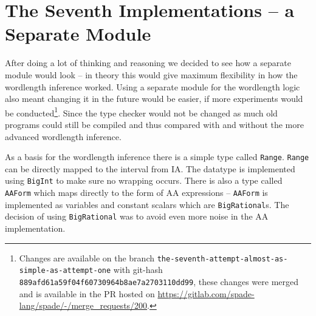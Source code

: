 \section{The Seventh Implementations -- a Separate Module}
\label{sec:Seven}
After doing a lot of thinking and reasoning we decided to see how a separate module would look -- in theory this would give maximum flexibility in how the wordlength inference worked. Using a separate module for the wordlength logic also meant changing it in the future would be easier, if more experiments would be conducted\cprotect\footnote{Changes are available on the branch \verb+the-seventh-attempt-almost-as-simple-as-attempt-one+ with git-hash \verb+889afd61a59f04f60730964b8ae7a2703110dd99+, these changes were merged and is available in the PR hosted on \url{https://gitlab.com/spade-lang/spade/-/merge_requests/200}.}. Since the type checker would not be changed as much old programs could still be compiled and thus compared with and without the more advanced wordlength inference.%

As a basis for the wordlength inference there is a simple type called \verb+Range+. \verb+Range+ can be directly mapped to the interval from IA. The datatype is implemented using \verb+BigInt+ to make sure no wrapping occurs. There is also a type called \verb+AAForm+ which maps directly to the form of AA expressions -- \verb+AAForm+ is implemented as variables and constant scalars which are \verb+BigRational+s. The decision of using \verb+BigRational+ was to avoid even more noise in the AA implementation.

